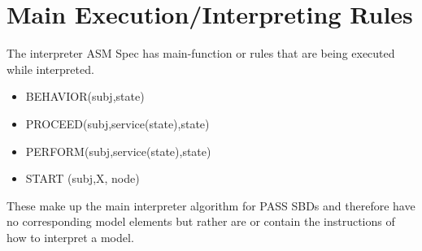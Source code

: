 \section{Main Execution/Interpreting Rules}
The interpreter ASM Spec has main-function or rules that are being executed while interpreted.

\begin{itemize}
	\item BEHAVIOR(subj,state)
	\item PROCEED(subj,service(state),state)
	\item PERFORM(subj,service(state),state)
	\item START (subj,X, node)
\end{itemize}

These make up the main interpreter algorithm for PASS SBDs and therefore have no corresponding model elements but rather are or contain the instructions of how to interpret a model.





